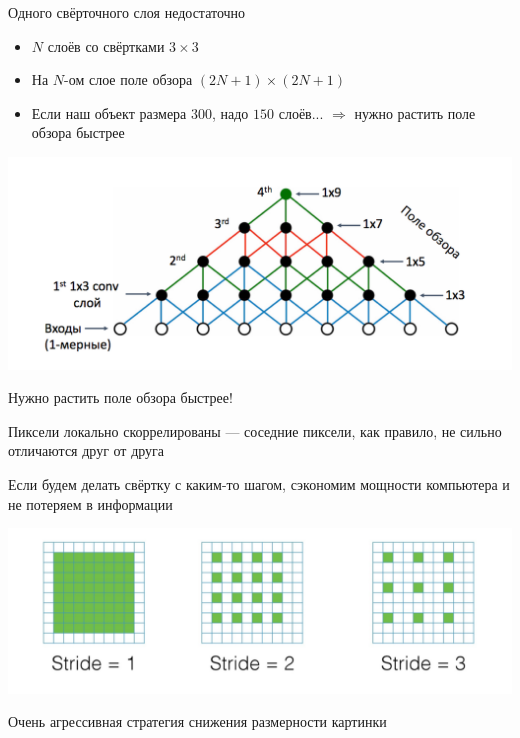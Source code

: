 \documentclass[notes,12pt, aspectratio=169]{beamer}
\newenvironment{wideitemize}{\itemize\addtolength{\itemsep}{10pt}}{\enditemize}
\begin{document}
\begin{frame}{Одного свёрточного слоя недостаточно}
\begin{itemize}
	\item  $N$ слоёв со свёртками $3 \times 3$ 
	\item  На $N$-ом слое поле обзора  $(2N + 1) \times (2N + 1)$
	\item  Если наш объект размера $300$, надо $150$ слоёв...  \alert{$\Rightarrow$ нужно растить поле обзора быстрее}
\end{itemize}

\begin{center}
	\includegraphics[width=.8\linewidth]{rec_field2.png}
\end{center}
\end{frame}


\begin{frame}{Нужно растить поле обзора быстрее!}
\begin{wideitemize}
\item Пиксели локально скоррелированы — соседние пиксели, как правило, не сильно отличаются друг от друга	
\item  Если будем делать свёртку с каким-то шагом, сэкономим мощности компьютера и не потеряем в информации

\begin{center}
	\includegraphics[width=.7\linewidth]{stride.png}
\end{center}

\item  \alert{Очень агрессивная стратегия снижения размерности картинки}
\end{wideitemize}
\end{frame}
\end{document}
